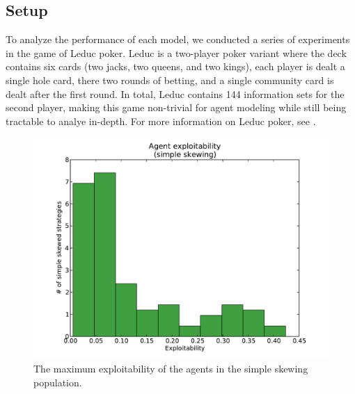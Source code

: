 \documentclass{aamas2013}
\begin{document}
    \subsection{Setup}
    To analyze the performance of each model, we conducted a series of experiments in the game of Leduc poker. Leduc is a two-player poker variant where the deck contains six cards (two jacks, two queens, and two kings), each player is dealt a single hole card, there two rounds of betting, and a single community card is dealt after the first round. In total, Leduc contains 144 information sets for the second player, making this game non-trivial for agent modeling while still being tractable to analye in-depth. For more information on Leduc poker, see \cite{bayesbluff}.

    \begin{figure}[thb]
      \centering
        \includegraphics[scale=.45]{exploitability_simple.pdf}
      \caption{The maximum exploitability of the agents in the simple skewing population.}
      \label{fig-exploitability-simple}
    \end{figure}
\end{document}
